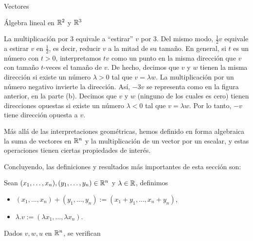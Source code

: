 \begin{chapter}{Vectores}
\begin{section}{\'Algebra lineal en $\mathbb R^2$ y $\mathbb R^3$}
\begin{ejemplo*}
            
    \end{ejemplo*}

     La multiplicación por 3 equivale a ``estirar'' $v$ por 3. Del mismo modo, $\frac12v$ 	equivale a estirar $v$ en $\frac12$, es decir, reducir $v$ a la mitad de su tamaño. En general, si $t$ es un número con $t> 0$, interpretamos $tv$ como un punto en la misma dirección que $v$ con tamaño  $t$-veces el tamaño de $v$.  De hecho, decimos que $v$ y $w$ tienen la misma dirección si existe un número $\lambda> 0$ tal que $v = \lambda w$. La multiplicación por un número negativo invierte la dirección. Así, $-3 v$ se representa como en la figura anterior, en la parte (b). Decimos que $v$ y $w$  (ninguno de los cuales es cero) tienen direcciones opuestas si existe un número $\lambda <0$ tal que $v =\lambda w$. Por lo tanto, $-v$ tiene dirección opuesta a $v$.

        
Más allá de las interpretaciones geométricas,  hemos definido  en forma algebraica la suma de vectores en $\mathbb R^n$ y  la multiplicación de un vector por un escalar,  y estas operaciones tienen ciertas propiedades de interés. 

Concluyendo, las definiciones y resultados más importantes de esta sección son:


Sean  $(x_1,\ldots,x_n), (y_1,\ldots,y_n) \in \mathbb R^n$ y $\lambda \in \mathbb R$, definimos
    \begin{itemize}
        \item $(x_1,\ldots,x_n)+ (y_1,\ldots,y_n):=(x_1+y_1,\ldots,x_n+y_n)$, 
        \item $\lambda.v := (\lambda x_1,\ldots,\lambda x_n)$.
    \end{itemize}
Dados  $v,w,u$ en $\mathbb R^n$,  se verifican


\end{section}
\end{chapter}
